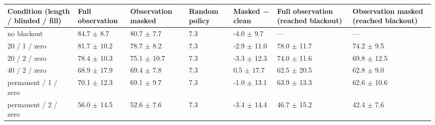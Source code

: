 \begin{tabular}{lllllll}
\toprule
Condition (length / blinded / fill) & Full observation & Observation masked & Random policy & Masked − clean & Full observation (reached blackout) & Observation masked (reached blackout) \\
\midrule
no blackout & 84.7 $\pm$ 8.7 & 80.7 $\pm$ 7.7 & 7.3 & -4.0 $\pm$ 9.7 & — & — \\
20 / 1 / zero & 81.7 $\pm$ 10.2 & 78.7 $\pm$ 8.2 & 7.3 & -2.9 $\pm$ 11.0 & 78.0 $\pm$ 11.7 & 74.2 $\pm$ 9.5 \\
20 / 2 / zero & 78.4 $\pm$ 10.3 & 75.1 $\pm$ 10.7 & 7.3 & -3.3 $\pm$ 12.3 & 74.0 $\pm$ 11.6 & 69.8 $\pm$ 12.5 \\
40 / 2 / zero & 68.9 $\pm$ 17.9 & 69.4 $\pm$ 7.8 & 7.3 & 0.5 $\pm$ 17.7 & 62.5 $\pm$ 20.5 & 62.8 $\pm$ 9.0 \\
permanent / 1 / zero & 70.1 $\pm$ 12.3 & 69.1 $\pm$ 9.7 & 7.3 & -1.0 $\pm$ 13.1 & 63.9 $\pm$ 13.3 & 62.6 $\pm$ 10.6 \\
permanent / 2 / zero & 56.0 $\pm$ 14.5 & 52.6 $\pm$ 7.6 & 7.3 & -3.4 $\pm$ 14.4 & 46.7 $\pm$ 15.2 & 42.4 $\pm$ 7.6 \\
\bottomrule
\end{tabular}
